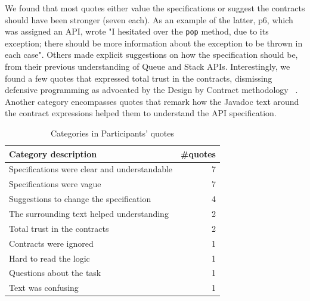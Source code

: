 We found that most quotes either value the specifications or suggest the contracts should have been stronger (seven each). As an example of the latter, p6, which was assigned an \contractjdoc{} API, wrote "I hesitated over the \texttt{pop} method, due to its exception; there should be more information about the exception to be thrown in each case". 
Others made explicit suggestions on how the specification should be, from their previous understanding of Queue and Stack APIs.
Interestingly, we found a few quotes that expressed total trust in the contracts, dismissing defensive programming as advocated by the Design by Contract methodology ~\cite{dbc}.
Another category encompasses quotes that remark how the Javadoc text around the contract expressions helped them to understand the API specification. 

\begin{table}
\centering
\caption{Categories in Participants' quotes}
\label{tab:categories}
\begin{tabular}{|l|r|} 
\hline
\textbf{Category description}                & \multicolumn{1}{l|}{\textbf{\#quotes}}  \\ 
\hline\hline
Specifications were clear and understandable & 7                                       \\ 
\hline
Specifications were vague                    & 7                                       \\ 
\hline
Suggestions to change the specification      & 4                                       \\ 
\hline
The surrounding text helped understanding    & 2                                       \\ 
\hline
Total trust in the contracts                 & 2                                       \\ 
\hline
Contracts were ignored                       & 1                                       \\ 
\hline
Hard to read the logic                       & 1                                       \\ 
\hline
Questions about the task                     & 1                                       \\ 
\hline
Text was confusing                           & 1                                       \\
\hline
\end{tabular}
\end{table}


